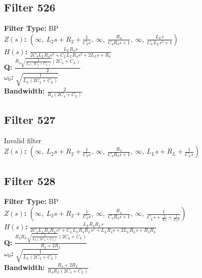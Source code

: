 \documentclass{article}
\begin{document}
\subsection*{Filter 526}
\textbf{Filter Type:} BP \\ 
\textbf{$Z(s)$:} $\left( \infty, \  L_{2} s + R_{2} + \frac{1}{C_{2} s}, \  \infty, \  \frac{R_{4}}{C_{4} R_{4} s + 1}, \  \infty, \  \frac{L_{L} s}{C_{L} L_{L} s^{2} + 1}\right)$ \\ 
\textbf{$H(s)$:} $\frac{L_{L} R_{4} s}{2 C_{4} L_{L} R_{4} s^{2} + C_{L} L_{L} R_{4} s^{2} + 2 L_{L} s + R_{4}}$ \\ 
\textbf{Q:} $\frac{R_{4} \sqrt{\frac{1}{L_{L} \left(2 C_{4} + C_{L}\right)}} \left(2 C_{4} + C_{L}\right)}{2}$ \\ 
\textbf{$\omega_0$:} $\sqrt{\frac{1}{L_{L} \left(2 C_{4} + C_{L}\right)}}$ \\ 
\textbf{Bandwidth:} $\frac{2}{R_{4} \left(2 C_{4} + C_{L}\right)}$ \\ 
\subsection*{Filter 527}
Invalid filter \\ 
\textbf{$Z(s)$:} $\left( \infty, \  L_{2} s + R_{2} + \frac{1}{C_{2} s}, \  \infty, \  \frac{R_{4}}{C_{4} R_{4} s + 1}, \  \infty, \  L_{L} s + R_{L} + \frac{1}{C_{L} s}\right)$ \\ 
\subsection*{Filter 528}
\textbf{Filter Type:} BP \\ 
\textbf{$Z(s)$:} $\left( \infty, \  L_{2} s + R_{2} + \frac{1}{C_{2} s}, \  \infty, \  \frac{R_{4}}{C_{4} R_{4} s + 1}, \  \infty, \  \frac{1}{C_{L} s + \frac{1}{R_{L}} + \frac{1}{L_{L} s}}\right)$ \\ 
\textbf{$H(s)$:} $\frac{L_{L} R_{4} R_{L} s}{2 C_{4} L_{L} R_{4} R_{L} s^{2} + C_{L} L_{L} R_{4} R_{L} s^{2} + L_{L} R_{4} s + 2 L_{L} R_{L} s + R_{4} R_{L}}$ \\ 
\textbf{Q:} $\frac{R_{4} R_{L} \sqrt{\frac{1}{L_{L} \left(2 C_{4} + C_{L}\right)}} \left(2 C_{4} + C_{L}\right)}{R_{4} + 2 R_{L}}$ \\ 
\textbf{$\omega_0$:} $\sqrt{\frac{1}{L_{L} \left(2 C_{4} + C_{L}\right)}}$ \\ 
\textbf{Bandwidth:} $\frac{R_{4} + 2 R_{L}}{R_{4} R_{L} \left(2 C_{4} + C_{L}\right)}$ \\ 
\end{document}
